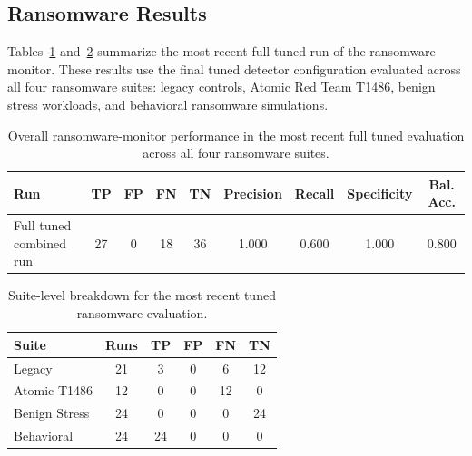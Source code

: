 \documentclass[twocolumn, 10pt]{scrartcl}
\begin{document}
\subsection{Ransomware Results}

Tables~\ref{tab:ransomware_tuned_overall} and~\ref{tab:evalransom_updated_2} summarize the most recent full tuned run of the ransomware monitor. These results use the final tuned detector configuration evaluated across all four ransomware suites: legacy controls, Atomic Red Team T1486, benign stress workloads, and behavioral ransomware simulations.

\begin{table}[t]
    \centering
    \small
    \begin{tabular}{lcccccccc}
    \toprule
    \textbf{Run} & \textbf{TP} & \textbf{FP} & \textbf{FN} & \textbf{TN} & \textbf{Precision} & \textbf{Recall} & \textbf{Specificity} & \textbf{Bal. Acc.} \\
    \midrule
    Full tuned combined run & 27 & 0 & 18 & 36 & 1.000 & 0.600 & 1.000 & 0.800 \\
    \bottomrule
    \end{tabular}
    \caption{Overall ransomware-monitor performance in the most recent full tuned evaluation across all four ransomware suites.}
    \label{tab:ransomware_tuned_overall}
\end{table}

\begin{table}[t]
    \centering
    \small
    \begin{tabular}{lccccc}
    \toprule
    \textbf{Suite} & \textbf{Runs} & \textbf{TP} & \textbf{FP} & \textbf{FN} & \textbf{TN} \\
    \midrule
    Legacy & 21 & 3 & 0 & 6 & 12 \\
    Atomic T1486 & 12 & 0 & 0 & 12 & 0 \\
    Benign Stress & 24 & 0 & 0 & 0 & 24 \\
    Behavioral & 24 & 24 & 0 & 0 & 0 \\
    \bottomrule
    \end{tabular}
    \caption{Suite-level breakdown for the most recent tuned ransomware evaluation.}
    \label{tab:evalransom_updated_2}
\end{table}
\end{document}
